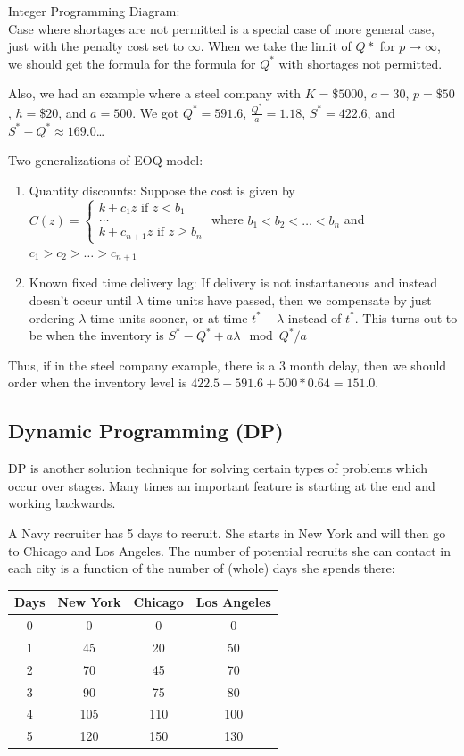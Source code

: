 \documentclass{article}
\begin{document}
\begin{section}{Integer Programming}
Diagram: \\

Case where shortages are not permitted is a special case of more general case, just with the 
penalty cost set to \(\infty \). When we take the limit of \(Q*\) for \(p\rightarrow \infty \), we should get the 
formula for the formula for \(Q^*\) with shortages not permitted.   

Also, we had an example where a steel company with \(K=\$5000\), \(c=30\), \(p=\$50\), \(h=\$20\), 
and \(a=500\). We got \(Q^*=591.6\), \(\frac{Q^*}{a}=1.18\), \(S^*=422.6\), and \(S^*-Q^*\approx 169.0\)\dots

Two generalizations of EOQ model: \\
\begin{enumerate}
    \item Quantity discounts: Suppose the cost is given by \(C(z)=\begin{cases} k+c_1z \text{ if } z<b_1 \\ \dots \\ k+c_{n+1}z \text{ if } z\geq b_n \end{cases}\) where 
    \(b_1<b_2<\dots<b_n\) and \(c_1>c_2>\dots>c_{n+1}\) 
    \item Known fixed time delivery lag: If delivery is not instantaneous and instead doesn't occur 
    until \(\lambda \) time units have passed, then we compensate by just ordering \(\lambda\) time units sooner, or at time \(t^*-\lambda \) 
    instead of  \(t^*\). This turns out to be when the inventory is \(S^*-Q^*+a \lambda \mod{Q^*/a}\)  
\end{enumerate}

Thus, if in the steel company example, there is a 3 month delay, then we should order when the inventory level is 
\(422.5-591.6+500*0.64=151.0\).

\section{Dynamic Programming (DP)}
DP is another solution technique for solving certain types of problems which occur over stages. Many times 
an important feature is starting at the end and working backwards.

\begin{eg}
    A Navy recruiter has 5 days to recruit. She starts in New York and will then go to Chicago and 
    Los Angeles. The number of potential recruits she can contact in each city is a function of the 
    number of (whole) days she spends there: 
    \begin{tabular}{c | c | c | c }
        Days & New York & Chicago & Los Angeles \\
        \hline
        0 & 0 & 0 & 0 \\
        1 & 45 & 20 & 50 \\
        2 & 70 & 45 & 70 \\
        3 & 90 & 75 & 80 \\
        4 & 105 & 110 & 100 \\
        5 & 120 & 150 & 130 \\
    \end{tabular}


\end{eg}
\end{section}
\end{document}

